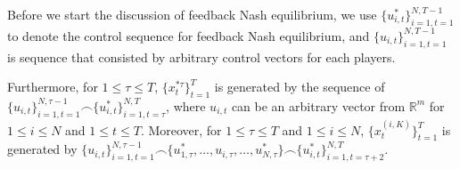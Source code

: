 \documentclass[letterpaper, 10 pt, conference]{ieeeconf}  %
\begin{document}
Before we start the discussion of feedback Nash equilibrium, we use $\{u_{i,t}^{*}\}_{i=1,t=1}^{N,T-1}$ to denote the control sequence for feedback Nash equilibrium, and $\{u_{i,t}\}_{i=1,t=1}^{N,T-1}$ is sequence that consisted by arbitrary control vectors for each players. 

Furthermore, for $1 \leq \tau \leq T$, $\{x_{t}^{*\tau}\}_{t=1}^{T}$ is generated by the sequence of $\{u_{i,t}\}_{i=1,t=1}^{N,\tau-1} \frown \{u_{i,t}^{*}\}_{i=1,t=\tau}^{N,T}$, where $u_{i,t}$ can be an arbitrary vector from $\mathbb{R}^{m}$ for $1 \leq i \leq N$ and $1 \leq t \leq T$. Moreover, for $1 \leq \tau \leq T$ and $1 \leq i \leq N$, $\{x_{t}^{(i,K)}\}_{t=1}^{T}$ is generated by $\{u_{i,t}\}_{i=1,t=1}^{N,\tau-1} \frown \{u_{1,\tau}^{*},\dots, u_{i,\tau},\dots,u_{N,\tau}^{*}\} \frown \{u_{i,t}^{*}\}_{i=1,t=\tau+2}^{N,T}$. 
\end{document}
